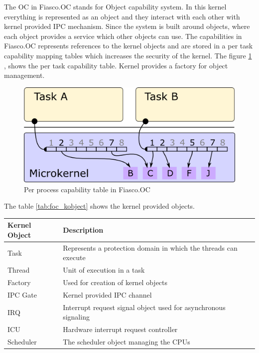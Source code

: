 The OC in Fiasco.OC stands for Object capability system. In this kernel everything is represented as an object and they interact with each other with kernel provided IPC mechanism. Since the system is built around objects, where each object provides a service which other objects can use. The capabilities in Fiasco.OC represents references to the kernel objects and are stored in a per task capability mapping tables which increases the security of the kernel. The figure \ref{fig:foc_cap} \cite{foc_pdf}, shows the per task capability table. Kernel provides a factory for object management.

\begin{figure}[h]
\centering
\includegraphics[width=0.7\linewidth]{figures/foc_cap.png}
\caption {Per process capability table in Fiasco.OC \cite{foc_pdf}}
\label{fig:foc_cap}
\end{figure}

The table \ref{tab:foc_kobject} shows the kernel provided objects.
\begin{center}
\begin{tabular}{|l|p{10cm}|}
\hline 
\textbf{ Kernel Object} & \textbf{Description} \\ \hline

Task & Represents a protection domain in which the threads can execute\\ \hline

Thread & Unit of execution in a task
\\ \hline

Factory & Used for creation of kernel objects \\ \hline

IPC Gate &  Kernel provided IPC channel\\ \hline

IRQ & Interrupt request signal object used for asynchronous signaling\\ \hline

ICU & Hardware interrupt request controller \\ \hline

Scheduler &  The scheduler object managing the CPUs \\ \hline
\end{tabular}
\label{tab:foc_kobject}
\end{center}

